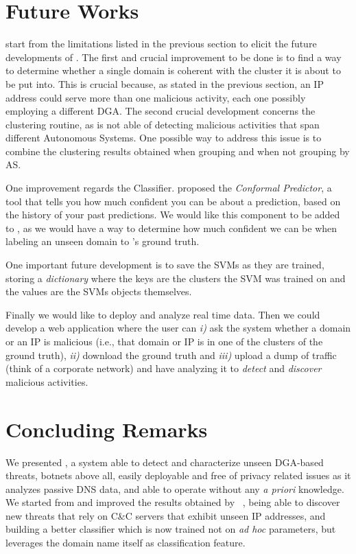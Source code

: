 
\section{Future Works} %
\label{sec:future_works}
 start from the limitations listed in the previous section to
elicit the future developments of \thesystem. The first and crucial improvement
to be done is to find a way to determine whether a single domain is coherent with
the cluster it is about to be put into. This is crucial because, as stated in the
previous section, an IP address could serve more than one malicious activity, each
one possibly employing a different DGA. The second crucial development concerns the
clustering routine, as \thesystem is not able of detecting malicious activities that
span different Autonomous Systems. One possible way to address this issue is to
combine the clustering results obtained when grouping and when not grouping by AS.

One improvement regards the Classifier. \citet{shafer2008} proposed the
\emph{Conformal Predictor}, a tool that tells you how much confident you can be
about a prediction, based on the history of your past predictions. We would like this
component to be added to \thesystem, as we would have a way to determine how much
confident we can be when labeling an unseen domain to \thesystem's ground truth.

One important future development is to save the SVMs as they are trained, storing
a \emph{dictionary} where the keys are the clusters the SVM was trained on and the
values are the SVMs objects themselves.

Finally we would like to deploy \thesystem and analyze real time data. Then
we could develop a web application where the user can \emph{i)} ask the system
whether a domain or an IP is malicious (i.e., that domain or IP is in one of the
clusters of the ground truth), \emph{ii)} download the ground truth
and \emph{iii)} upload a dump of traffic (think of a corporate network) and have
\thesystem analyzing it to \emph{detect} and \emph{discover} malicious activities.



\section{Concluding Remarks} %
\label{sec:conclusions}
We presented \thesystem, a system able to detect and characterize unseen DGA-based
threats, botnets above all, easily deployable and free of privacy related issues
as it analyzes passive DNS data, and able to operate without any \emph{a priori}
knowledge. We started from and improved the results obtained by
\phoenix~\cite{schiavoni2013}, being able to discover new threats that rely on C\&C
servers that exhibit unseen IP addresses, and building a better classifier
which is now trained not on \emph{ad hoc} parameters, but leverages the domain
name itself as classification feature.

